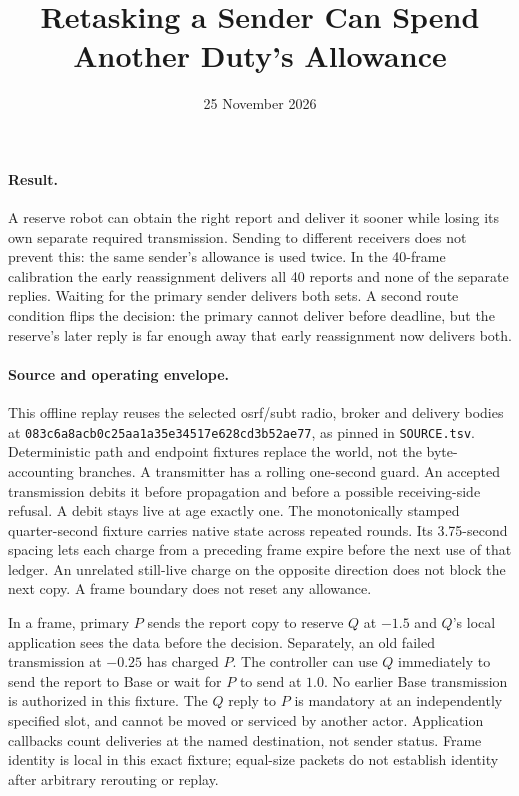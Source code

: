 \documentclass[11pt]{article}
\title{Retasking a Sender Can Spend Another Duty's Allowance}
\date{25 November 2026}
\begin{document}
\maketitle
\paragraph{Result.}
A reserve robot can obtain the right report and deliver it sooner while
losing its own separate required transmission. Sending to different receivers
does not prevent this: the same sender's allowance is used twice. In the
40-frame calibration the early reassignment delivers all 40 reports and
none of the separate replies. Waiting for the primary sender delivers both
sets. A second route condition flips the decision: the primary cannot
deliver before deadline, but the reserve's later reply is far enough
away that early reassignment now delivers both.

\paragraph{Source and operating envelope.}
This offline replay reuses the selected osrf/subt radio, broker and delivery
bodies at \texttt{083c6a8acb0c25aa1a35e34517e628cd3b52ae77}, as pinned
in \texttt{SOURCE.tsv}. Deterministic path and endpoint fixtures replace
the world, not the byte-accounting branches. A transmitter has a rolling
one-second guard. An accepted transmission debits it before propagation and
before a possible receiving-side refusal. A debit stays live at age exactly
one. The monotonically stamped quarter-second fixture carries native
state across repeated rounds. Its 3.75-second spacing lets each charge
from a preceding frame expire before the next use of that ledger. An
unrelated still-live charge on the opposite direction does not block
the next copy. A frame boundary does not reset any allowance.

In a frame, primary $P$ sends the report copy to reserve $Q$ at $-1.5$
and $Q$'s local application sees the data before the decision. Separately,
an old failed transmission at $-0.25$ has charged $P$. The controller can
use $Q$ immediately to send the report to Base or wait for $P$ to send at
$1.0$. No earlier Base transmission is authorized in this fixture.
The $Q$ reply to $P$ is mandatory at an independently specified slot,
and cannot be moved or serviced by another actor. Application callbacks
count deliveries at the named destination, not sender status. Frame
identity is local in this exact fixture; equal-size packets do not
establish identity after arbitrary rerouting or replay.
\end{document}
